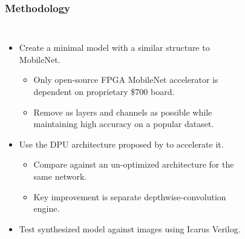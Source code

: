 \documentclass[english]{beamer}
\begin{document}
\begin{frame}
\frametitle{Methodology}
\begin{columns}
	\begin{itemize}
		\item Create a minimal model with a similar structure to MobileNet.
		\begin{itemize}
			\item Only open-source FPGA MobileNet
			accelerator\supercite{solovyev2019mobilenet} is dependent on
			proprietary \$700 board.
			\item Remove as layers and channels as possible while maintaining high
			accuracy on a popular dataset.
		\end{itemize}
		\item Use the DPU architecture proposed by
		\citeauthor{mobilenet2019fpga}\supercite{mobilenet2019fpga}
		to accelerate it.
		\begin{itemize}
			\item Compare against an un-optimized architecture for the same network.
			\item Key improvement is separate depthwise-convolution engine.
		\end{itemize}
		\item Test synthesized model against images using Icarus Verilog.
	\end{itemize}
	\begin{figure}
		\centering
		
	\end{figure}
\end{columns}
\end{frame}
\end{document}
